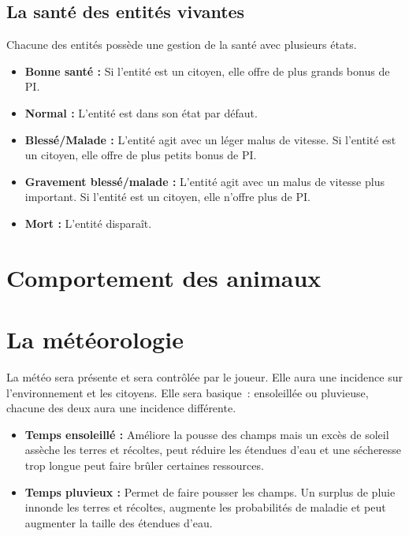 \documentclass[a4paper]{article}
\begin{document}
      \subsection{La santé des entités vivantes}
        Chacune des entités possède une gestion de la santé avec plusieurs états.
        \begin{itemize}
          \item \textbf{Bonne santé :} \small{ Si l'entité est un citoyen, elle offre de plus grands bonus de PI.}
          \item \textbf{Normal :} \small{ L'entité est dans son état par défaut.}
          \item \textbf{Blessé/Malade :} \small{ L'entité agit avec un léger malus de vitesse. Si l'entité est un citoyen, elle offre de plus petits bonus de PI.}
          \item \textbf{Gravement blessé/malade :} \small{ L'entité agit avec un malus de vitesse plus important. Si l'entité est un citoyen, elle n'offre plus de PI.}
          \item \textbf{Mort :} \small{ L'entité disparaît.}
        \end{itemize}


    \section{Comportement des animaux}


    \section{La météorologie}
      La météo sera présente et sera contrôlée par le joueur. Elle aura une incidence sur l'environnement et les citoyens. Elle sera basique : ensoleillée ou pluvieuse, chacune des deux aura une incidence différente. 
      \begin{itemize}
        \item \textbf{Temps ensoleillé :} \small{ Améliore la pousse des champs mais un excès de soleil assèche les terres et récoltes, peut réduire les étendues d'eau et une sécheresse trop longue peut faire brûler certaines ressources.}
        \item \textbf{Temps pluvieux :} \small{ Permet de faire pousser les champs. Un surplus de pluie innonde les terres et récoltes, augmente les probabilités de maladie et peut augmenter la taille des étendues d'eau.}
      \end{itemize}
\end{document}
